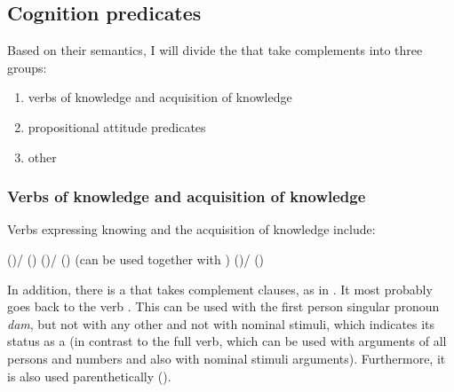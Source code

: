 
\subsection{Cognition predicates}
\label{ssec:Cognition predicates}

Based on their semantics, I will divide the  that take complements into three groups:
%
\begin{enumerate}
	\item	verbs of knowledge and acquisition of knowledge
	\item	propositional attitude predicates
	\item	other 
\end{enumerate}



\subsubsection{Verbs of knowledge and acquisition of knowledge}
\label{sssec:Verbs of knowledge and acquisition of knowledge}

Verbs expressing knowing and the acquisition of knowledge include:
%
\begin{exe}
	\ex	\label{ex:verbs of knowledge}
	\begin{xlist}
		\ex	{} ()\slash{} () 
		\ex	{} ()\slash{} ()  (can be used together with  )
		\ex	{} ()\slash{} ()  
	\end{xlist}
\end{exe}

In addition, there is a    that takes complement clauses, as in . It most probably goes back to the verb . This  can be used with the first person singular  pronoun \textit{dam}, but not with any other   and not with nominal stimuli, which indicates its status as a  (in contrast to the full verb, which can be used with arguments of all persons and numbers and also with nominal stimuli arguments). Furthermore, it is also used parenthetically ().


